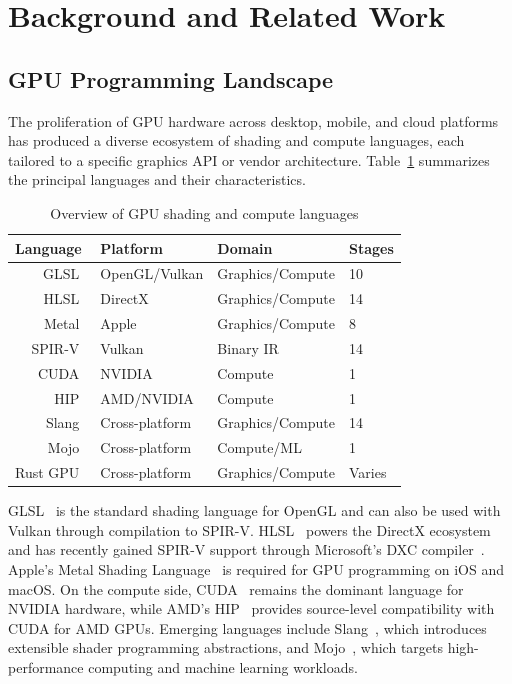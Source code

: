 \documentclass{svproc}
\begin{document}
\section{Background and Related Work}

\subsection{GPU Programming Landscape}

The proliferation of GPU hardware across desktop, mobile, and cloud platforms has produced a diverse ecosystem of shading and compute languages, each tailored to a specific graphics API or vendor architecture. Table~\ref{tab:languages} summarizes the principal languages and their characteristics.

\begin{table}
\caption{Overview of GPU shading and compute languages}
\label{tab:languages}
\begin{center}
\begin{tabular}{r@{\quad}lll}
\hline
\multicolumn{1}{l}{\rule{0pt}{12pt}\textbf{Language}} & \textbf{Platform} & \textbf{Domain} & \textbf{Stages} \\[2pt]
\hline\rule{0pt}{12pt}
GLSL~\cite{kessenich2016opengl} & OpenGL/Vulkan & Graphics/Compute & 10 \\
HLSL~\cite{microsoft2023hlsl} & DirectX & Graphics/Compute & 14 \\
Metal~\cite{apple2023metal} & Apple & Graphics/Compute & 8 \\
SPIR-V~\cite{khronos2022spirv} & Vulkan & Binary IR & 14 \\
CUDA~\cite{nickolls2008cuda} & NVIDIA & Compute & 1 \\
HIP~\cite{amd2023hip} & AMD/NVIDIA & Compute & 1 \\
Slang~\cite{he2018slang} & Cross-platform & Graphics/Compute & 14 \\
Mojo~\cite{modular2023mojo} & Cross-platform & Compute/ML & 1 \\
Rust GPU~\cite{embark2023rustgpu} & Cross-platform & Graphics/Compute & Varies \\[2pt]
\hline
\end{tabular}
\end{center}
\end{table}

GLSL~\cite{kessenich2016opengl} is the standard shading language for OpenGL and can also be used with Vulkan through compilation to SPIR-V. HLSL~\cite{microsoft2023hlsl} powers the DirectX ecosystem and has recently gained SPIR-V support through Microsoft's DXC compiler~\cite{microsoft2023dxc}. Apple's Metal Shading Language~\cite{apple2023metal} is required for GPU programming on iOS and macOS. On the compute side, CUDA~\cite{nickolls2008cuda} remains the dominant language for NVIDIA hardware, while AMD's HIP~\cite{amd2023hip} provides source-level compatibility with CUDA for AMD GPUs. Emerging languages include Slang~\cite{he2018slang}, which introduces extensible shader programming abstractions, and Mojo~\cite{modular2023mojo}, which targets high-performance computing and machine learning workloads.
\end{document}
